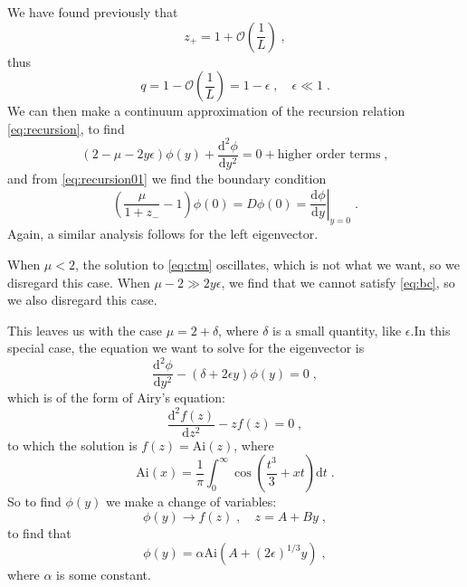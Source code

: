 \documentclass[a4paper,10pt]{article}
\newcommand{\D}{\mathrm{d}}
\newcommand{\Or}{\mathcal{O}}
\newcommand{\OL}{\Or\left(\frac{1}{L}\right)}
\newcommand{\Ai}{\mathrm{Ai}}
\begin{document}
We have found previously that
\begin{equation}\label{eq:z+}
  z_+ = 1 + \OL \;,
\end{equation}
thus
\begin{equation}\label{eq:q}
  q = 1 - \OL = 1 - \epsilon \;, \quad \epsilon \ll 1 \;.
\end{equation}
We can then make a continuum approximation of the recursion relation \eqref{eq:recursion}, to find
\begin{equation}\label{eq:ctm}
  (2-\mu - 2y\epsilon) \phi(y) + \frac{\D^2 \phi}{\D y^2} = 0 + \mbox{higher order terms} \;, %
\end{equation}
and from \eqref{eq:recursion01} we find the boundary condition
\begin{equation}\label{eq:bc}
  \left( \frac{\mu}{1+z_-} -1 \right) \phi(0) = D\phi(0) = \left. \frac{\D \phi}{\D y} \right|_{y=0} \;.
\end{equation}
Again, a similar analysis follows for the left eigenvector.

When $\mu < 2$, the solution to \eqref{eq:ctm} oscillates, which is not what we want, so we disregard this case. When $\mu - 2 \gg 2y\epsilon$, we find that we cannot satisfy \eqref{eq:bc}, so we also disregard this case. 

This leaves us with the case $\mu = 2 + \delta$, where $\delta$ is a small quantity, like $\epsilon$.In this special case, the equation we want to solve for the eigenvector is
\begin{equation}\label{eq:ctm2}
   \frac{\D^2 \phi}{\D y^2} - (\delta + 2\epsilon y) \phi(y) = 0 \;,
\end{equation}
which is of the form of Airy's equation:
\begin{equation}\label{eq:Airy-eq}
  \frac{\D^2 f(z)}{\D z^2} - zf(z) = 0 \;,
\end{equation}
to which the solution is $f(z) = \Ai(z)$, where 
\begin{equation}\label{eq:Airy-fn}
  \Ai(x) = \frac{1}{\pi} \int_0^\infty \cos\left(\frac{t^3}{3} + xt\right) \D t \;.
\end{equation}
So to find $\phi(y)$ we make a change of variables:
\begin{equation}
  \phi(y) \to f(z) \;, \quad z = A + By \;,
\end{equation}
to find that 
\begin{equation}\label{eq:phi_gen_soln}
  \phi(y) = \alpha \Ai(A + (2\epsilon)^{1/3}y) \;,
\end{equation}
where $\alpha$ is some constant.
\end{document}
